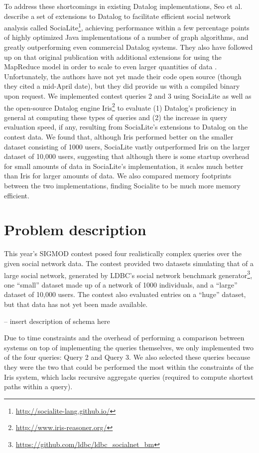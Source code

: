 \documentclass{article}
\begin{document}
\begin{multicols}{2}
To address these shortcomings in existing Datalog implementations, Seo et al. \cite{seo-et-al-13a} describe a set of extensions to Datalog to facilitate efficient social network analysis called SociaLite\footnote{\protect\url{http://socialite-lang.github.io/}}, achieving performance within a few percentage points of highly optimized Java implementations of a number of graph algorithms, and greatly outperforming even commercial Datalog systems. They also have followed up on that original publication with additional extensions for using the MapReduce model in order to scale to even larger quantities of data \cite{seo-et-al-13b}. Unfortunately, the authors have not yet made their code open source (though they cited a mid-April date), but they did provide us with a compiled binary upon request. We implemented contest queries 2 and 3 using SociaLite as well as the open-source Datalog engine Iris\footnote{\protect\url{http://www.iris-reasoner.org/}} to evaluate (1) Datalog's proficiency in general at computing these types of queries and (2) the increase in query evaluation speed, if any, resulting from SociaLite's extensions to Datalog on the contest data. We found that, although Iris performed better on the smaller dataset consisting of 1000 users, SociaLite vastly outperformed Iris on the larger dataset of 10,000 users, suggesting that although there is some startup overhead for small amounts of data in SociaLite's implementation, it scales much better than Iris for larger amounts of data. We also compared memory footprints between the two implementations, finding Socialite to be much more memory efficient.

\section{Problem description}

This year’s SIGMOD contest posed four realistically complex queries over the given social network data. The contest provided two datasets simulating that of a large social network, generated by LDBC's social network benchmark generator\footnote{\protect\url{https://github.com/ldbc/ldbc_socialnet_bm}}, one ``small'' dataset made up of a network of 1000 individuals, and a ``large'' dataset of 10,000 users. The contest also evaluated entries on a ``huge'' dataset, but that data has not yet been made available. 

-- insert description of schema here

Due to time constraints and the overhead of performing a comparison between systems on top of implementing the queries themselves, we only implemented two of the four queries: Query 2 and Query 3. We also selected these queries because they were the two that could be performed the most within the constraints of the Iris system, which lacks recursive aggregate queries (required to compute shortest paths within a query).


\end{multicols}
\end{document}

